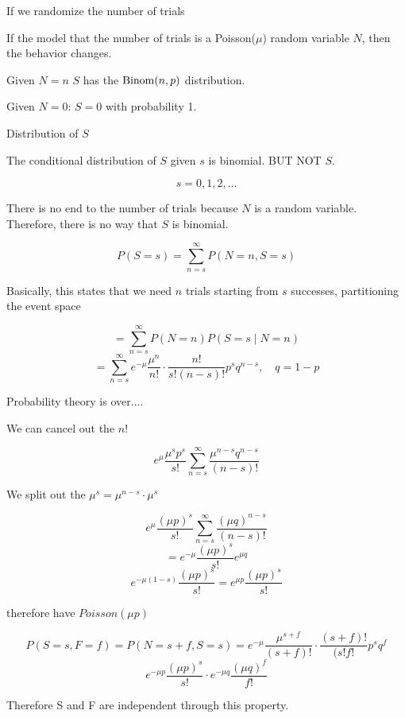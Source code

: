\documentclass{report}
\begin{document}
If we randomize the number of trials


If the model that the number of trials is a Poisson($ \mu $) random variable $ N $, then the behavior changes.

Given $ N=n $  $ S $ has the $ \operatorname{Binom}(n, p) $ distribution. 

Given $ N=0 $: $ S=0 $ with probability 1. 


Distribution of $ S $ 

The conditional distribution of $ S$ given $ s $ is binomial. BUT NOT $ S $. 

\[s= 0,1,2,\dots\]

There is no end to the number of trials because $ N $ is a random variable. Therefore, there is no way that $S$ is binomial.  

\[P(S=s) = \sum_{n=s}^{\infty}P(N=n , S=s)\]

Basically, this states that we need $n$ trials starting from $s$ successes, partitioning the event space

\[= \sum_{n=s}^{\infty} P(N=n)P(S=s \mid N=n)\]
\[= \sum_{n=s}^{\infty} e^{-\mu} \frac{\mu^n}{n!} \cdot \frac{n!}{s!(n-s)!}p^sq^{n-s}, \quad q=1-p\]

Probability theory is over....

We can cancel out the $ n! $

\[e^{\mu} \frac{\mu^s p^s}{s!} \sum_{n=s}^{\infty} \frac{\mu^{n-s}q^{n-s}}{(n-s)!}\]

We split out the $ \mu^s = \mu^{n-s} \cdot \mu^s $

\[e^{\mu} \frac{(\mu p)^s}{s!} \sum_{n=s}^{\infty}\frac{(\mu q)^{n-s}}{(n-s)!}\]
\[= e^{-\mu} \frac{(\mu p)^s}{s!} e^{\mu q}\]
\[e^{-\mu (1-s)}{\frac{(\mu p)^s}{s!}} = e^{\mu p} \frac{(\mu p)^s}{s!}\]

therefore have $Poisson(\mu p)$


\[
	P(S=s, F=f) = P(N=s+f, S=s) = e^{-\mu} \frac{\mu^{s+f}}{(s+f)!} \cdot \frac{(s+f)!}{(s!f!}p^sq^f 
\]
\[e^{-\mu p} \frac{(\mu p)^s}{s!} \cdot e^{-\mu q} \frac{(\mu q)^f}{f!}\]

Therefore S and F are independent through this property. 
\end{document}
